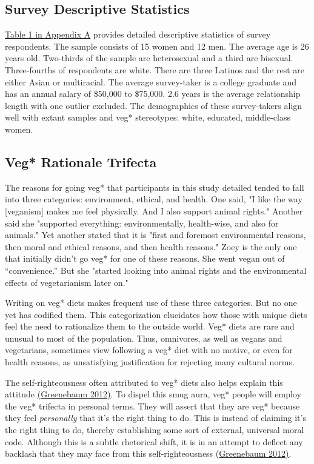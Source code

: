 \documentclass[twoside]{report}
\begin{document}
\subsection{Survey Descriptive Statistics}

\hyperlink{appendix-a}{Table 1 in Appendix A} provides detailed descriptive statistics of survey respondents. The sample consists of 15 women and 12 men. The average age is 26 years old. Two-thirds of the sample are heterosexual and a third are bisexual. Three-fourths of respondents are white. There are three
Latinos and the rest are either Asian or multiracial. The average
survey-taker is a college graduate and has an annual salary of \$50,000
to \$75,000. 2.6 years is the average relationship length with
one outlier excluded. The demographics of these survey-takers align
well with extant samples and veg* stereotypes: white, educated,
middle-class women.

\subsection{Veg* Rationale Trifecta}

The reasons for going veg* that participants in this study detailed tended to fall into three categories: environment, ethical, and health. One said, "I like the way {[}veganism{]} makes me feel physically. And I also support animal rights." Another said she "supported everything: environmentally, health-wise, and also for animals." Yet another stated that it is "first and foremost environmental reasons, then moral and ethical reasons, and then health reasons." Zoey is the only one that initially didn't go veg* for one of
these reasons. She went vegan out of ``convenience.'' But she "started
looking into animal rights and the environmental effects of vegetarianism later on."

Writing on veg* diets makes frequent use of these three categories. But
no one yet has codified them. This categorization elucidates how those with unique diets feel the need to rationalize them to the outside world. Veg*
diets are rare and unusual to most of the population. Thus, omnivores, as well as vegans and vegetarians, sometimes view following a veg* diet with no motive, or even for health reasons, as unsatisfying justification for rejecting many cultural norms.

The self-righteousness often attributed to veg* diets also helps explain
this attitude \hyperlink{greenebaum}{(Greenebaum 2012)}. To dispel this smug aura, veg* people will employ the veg* trifecta in personal terms. They will assert that they are veg* because they feel \emph{personally} that it's the right thing to do. This is instead of claiming it's the right thing to do, thereby
establishing some sort of external, universal moral code. Although this
is a subtle rhetorical shift, it is in an attempt to deflect any
backlash that they may face from this self-righteousness (\hyperlink{greenebaum}{Greenebaum 2012)}.
\end{document}
